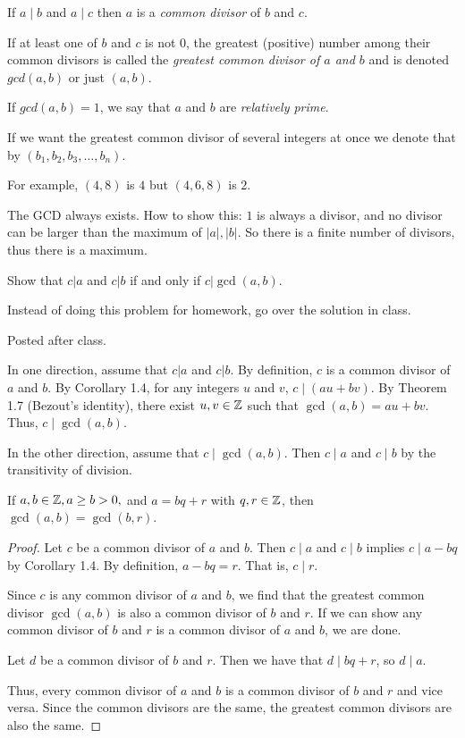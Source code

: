 \documentclass[letterpaper, 11 pt]{article}
\begin{document}
\begin{defn} If $a\mid b$ and $a\mid c$ then $a$ is a \emph{common divisor} of $b$ and $c$.

 If at least one of $b$ and $c$ is not $0$, the greatest (positive) number among their common divisors  is called the \emph{greatest common divisor of $a$ and $b$} and is denoted $gcd(a,b)$ or just $(a,b)$. 
 
 If $gcd(a,b)=1$, we say that $a$ and $b$ are \emph{relatively prime}.

If we want the greatest common divisor of several integers at once we denote that by $(b_1,b_2,b_3,\dots,b_n)$.
\end{defn}

For example, $(4,8)$ is $4$ but $(4,6,8)$ is $2$.

The GCD always exists. How to show this: $1$ is always a divisor, and no divisor can be larger than the maximum of $|a|,|b|$. So there is a finite number of divisors, thus there is a maximum.

\begin{br} 
Show that $c|a$ and $c|b$ if and only if $c|\gcd(a,b)$. 
\end{br}

Instead of doing this problem for homework, go over the solution in class.
\begin{solution} Posted after class.

 In one direction, assume that $c|a$ and $c|b$. By definition, $c$ is a common divisor of $a$ and $b$. By Corollary 1.4, for any integers $u$ and $v$, $c\mid(au+bv)$. By Theorem 1.7 (Bezout's identity), there exist $u,v\in\mathbb Z$ such that $\gcd(a,b)=au+bv$. Thus, $c\mid\gcd(a,b)$.

In the other direction, assume that $c\mid\gcd(a,b)$. Then $c\mid a$ and $c\mid b$ by the transitivity of division.
\end{solution}

\begin{lem}[Lemma 1.5]
 If $a,b\in\mathbb Z, a\geq b>0,$ and $a=bq+r$ with $q,r\in\mathbb Z$, then $\gcd(a,b)=\gcd(b,r)$. 
\end{lem}
\begin{proof}
Let $c$ be a common divisor of $a$ and $b$. Then $c\mid a$ and $c\mid b$ implies $c\mid a-bq$ by Corollary 1.4. By definition, $a-bq=r$. That is, $c\mid r$. 

Since $c$ is any common divisor of $a$ and $b$, we find that the greatest common divisor $\gcd(a,b)$ is also a common divisor of $b$ and $r$. If we can show any common divisor of $b$ and $r$ is a common divisor of $a$ and $b$, we are done.

Let $d$ be a common divisor of $b$ and $r$. Then we have that $d\mid bq+r$, so $d\mid a$. 

Thus, every common divisor of $a$ and $b$ is a common divisor of $b$ and $r$ and vice versa. Since the common divisors are the same, the greatest common divisors are also the same.
\end{proof}
\end{document}
